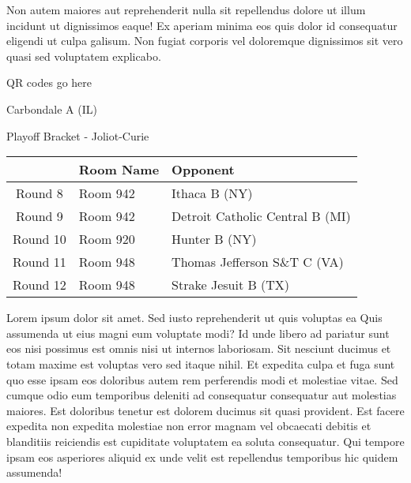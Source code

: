 \documentclass{article}%
\begin{document}
\newline%
Non autem maiores aut reprehenderit nulla sit repellendus dolore ut illum incidunt ut dignissimos eaque! Ex aperiam minima eos quis dolor id consequatur eligendi ut culpa galisum. Non fugiat corporis vel doloremque dignissimos sit vero quasi sed voluptatem explicabo.\newline%
\newline%
%
\vspace*{30pt}%
\begin{center}%
\begin{Huge}%
QR codes go here%
\end{Huge}%
\end{center}%
\newpage%
\begin{center}%
\begin{Huge}%
Carbondale A (IL)%
\end{Huge}%
\vspace*{8pt}%
\linebreak%
\begin{Large}%
Playoff Bracket {-} Joliot{-}Curie%
\end{Large}%
\end{center}%
\begin{tabularx}{\textwidth}{|c|Y|Y|}%
\hline%
&Room Name&Opponent\\%
\hline%
Round 8&Room 942&Ithaca B (NY)\\%
Round 9&Room 942&Detroit Catholic Central B (MI)\\%
Round 10&Room 920&Hunter B (NY)\\%
Round 11&Room 948&Thomas Jefferson S\&T C (VA)\\%
Round 12&Room 948&Strake Jesuit B (TX)\\%
\hline%
\end{tabularx}%
\vspace*{8pt}%
\linebreak%
\newline%
\newline%
Lorem ipsum dolor sit amet. Sed iusto reprehenderit ut quis voluptas ea Quis assumenda ut eius magni eum voluptate modi? Id unde libero ad pariatur sunt eos nisi possimus est omnis nisi ut internos laboriosam. Sit nesciunt ducimus et totam maxime est voluptas vero sed itaque nihil. Et expedita culpa et fuga sunt quo esse ipsam eos doloribus autem rem perferendis modi et molestiae vitae.\newline%
\newline%
Sed cumque odio eum temporibus deleniti ad consequatur consequatur aut molestias maiores. Est doloribus tenetur est dolorem ducimus sit quasi provident. Est facere expedita non expedita molestiae non error magnam vel obcaecati debitis et blanditiis reiciendis est cupiditate voluptatem ea soluta consequatur. Qui tempore ipsam eos asperiores aliquid ex unde velit est repellendus temporibus hic quidem assumenda!\newline%
\end{document}
